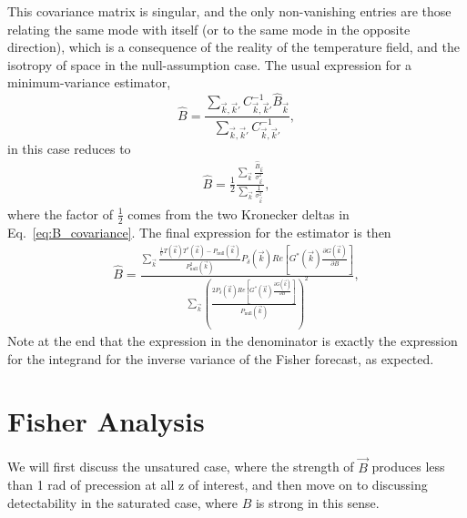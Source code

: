 \documentclass[12pt]{paper}
\newcommand{\beq}{\begin{equation}}
\newcommand{\eeq}{\end{equation}}
\newcommand{\bga}{\begin{gathered}}
\newcommand{\ega}{\end{gathered}}
\begin{document}
This covariance matrix is singular, and the only non-vanishing entries are those relating the same mode with itself (or to the same mode in the opposite direction), which is a consequence of the reality of the temperature field, and the isotropy of space in the null-assumption case. The usual expression for a minimum-variance estimator,
\beq
\widehat B = \frac{\sum_{\vec k, \vec k'}C^{-1}_{\vec k, \vec k'}\widehat B_{\vec k}}{\sum_{\vec k, \vec k'}C^{-1}_{\vec k, \vec k'}},
\label{eq:B_mve}
\eeq
in this case reduces to 
\beq
\bga
\widehat B = \frac{1}{2}\frac{\sum_{\vec k}\frac{\widehat B_{\vec k}}{\sigma^2_{{\vec k}}}}{\sum_{\vec k}\frac{1}{\sigma^2_{\vec k}}},
\ega
\label{eq:B_mve}
\eeq
where the factor of $\frac{1}{2}$ comes from the two Kronecker deltas in Eq.~\ref{eq:B_covariance}. The final expression for the estimator is then
\beq
\bga
\widehat B = \frac{\sum_{\vec k}\frac{\frac{1}{V}T(\vec k)T^*(\vec k) - P_\text{null}(\vec k)}{P_\text{null}^2(\vec k)}P_{\delta}(\vec k)Re\left[G^*(\vec k)\frac{\partial G(\vec k)}{\partial B}\right]}{{\sum_{\vec k}\left(\frac{2P_{\delta}(\vec k)Re\left[G^*(\vec k)\frac{\partial G(\vec k)}{\partial B}\right]}{P_\text{null}(\vec k)}\right)^2}},
\ega
\label{eq:B_estimator}
\eeq
Note at the end that the expression in the denominator is exactly the expression for the integrand for the inverse variance of the Fisher forecast, as expected. 
\section{Fisher Analysis}
\label{sec:fisher}

We will first discuss the unsatured case, where the strength of $\vec B$ produces less than 1 rad of precession at all z of interest, and then move on to discussing detectability in the saturated case, where $B$ is strong in this sense.
\end{document}
